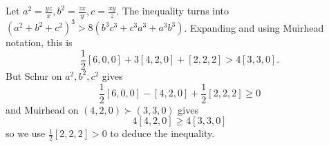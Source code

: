 Let $a^2=\frac{yz}{x},b^2=\frac{zx}{y},c=\frac{xy}{z}$. The inequality turns into $(a^2+b^2+c^2)^3>8(b^3c^3+c^3a^3+a^3b^3)$. Expanding and using Muirhead notation, this is \[\frac{1}{2}[6,0,0]+3[4,2,0]+[2,2,2]>4[3,3,0].\] But Schur on $a^2,b^2,c^2$ gives \[\frac{1}{2}[6,0,0]-[4,2,0]+\frac{1}{2}[2,2,2]\geq0\] and Muirhead on $(4,2,0)\succ(3,3,0)$ gives \[4[4,2,0]\geq4[3,3,0]\] so we use $\frac{1}{2}[2,2,2]>0$ to deduce the inequality.